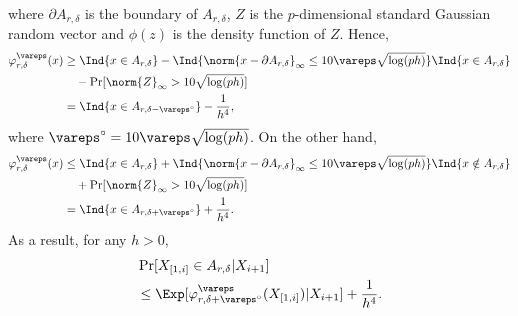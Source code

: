 \documentclass[aos]{imsart}
\begin{document}
where $\partial A_{r,\delta}$ is the boundary of $A_{r,\delta}$, $Z$ is the $p$-dimensional standard Gaussian random vector and $\phi(z)$ is the density function of $Z$. Hence,
\begin{equation}\label{eq:varphi_lowerbound}
\begin{aligned}
    \varphi_{r,\delta}^\vareps(x)  
    & \geq \Ind\{x \in A_{r,\delta}\} 
    - \Ind\{\norm{x - \partial A_{r,\delta}}_\infty \leq 10 \vareps \sqrt{\log(ph)}\}
    \Ind\{x \in A_{r,\delta}\} \\
    & \quad - \Pr[\norm{Z}_\infty > 10 \sqrt{\log(ph)}] \\
    & = \Ind\{x \in A_{r,\delta-\vareps^\circ}\} - \frac{1}{h^4},
\end{aligned}
\end{equation}
where $\vareps^\circ = 10 \vareps \sqrt{\log(ph)}$. On the other hand,
\begin{equation}\label{eq:varphi_upperbound}
\begin{aligned}
    \varphi_{r,\delta}^\vareps(x) 
    & \leq \Ind\{x \in A_{r,\delta}\} + \Ind\{\norm{x - \partial A_{r,\delta}}_\infty \leq 10 \vareps \sqrt{\log(ph)}\}
    \Ind\{x \notin A_{r,\delta}\} \\
    & \quad + \Pr[\norm{Z}_\infty > 10 \sqrt{\log(ph)}]\\
    & = \Ind\{x \in A_{r,\delta+\vareps^\circ}\} + \frac{1}{h^4}.
\end{aligned}
\end{equation}
As a result, for any $h > 0$,
\begin{equation} \label{eq:anti_concentration_smoothing}
\begin{aligned}
    & \Pr[X_{[1,i]} \in A_{r,\delta} | X_{i+1}] \\
    & \leq \Exp[\varphi_{r,\delta+\vareps^\circ}^\vareps(X_{[1,i]}) 
    | X_{i+1}] 
    + \frac{1}{h^4}.
\end{aligned}
\end{equation}
\end{document}
